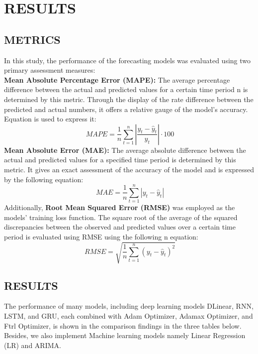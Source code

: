 \documentclass{ieeeojies}
\begin{document}
\section{RESULTS}
\subsection{METRICS}
\par In this study, the performance of the forecasting models was evaluated using two primary assessment measures:\\
\textbf{Mean Absolute Percentage Error (MAPE):} The average percentage difference between the actual and predicted values for a certain time period n is determined by this metric. Through the display of the rate difference between the predicted and actual numbers, it offers a relative gauge of the model's accuracy. Equation is used to express it:
\[\ MAPE = \frac{1}{n}\sum_{t=1}^{n} \left|\frac{y_t - \hat{y}_t}{y_t}\right| \cdot {100} \]
\textbf{Mean Absolute Error (MAE):} The average absolute difference between the actual and predicted values for a specified time period is determined by this metric. It gives an exact assessment of the accuracy of the model and is expressed by the following equation:
\[\ MAE = \frac{1}{n}\sum_{t=1}^{n} \left|{y_t - \hat{y}_t}\right|\]
Additionally, \textbf{Root Mean Squared Error (RMSE)} was employed as the models' training loss function. The square root of the average of the squared discrepancies between the observed and predicted values over a certain time period is evaluated using RMSE using the following n equation:
\[\ RMSE = \sqrt{\frac{1}{n}\sum_{t=1}^{n} (y_t - \hat{y}_t)^2}\] 

\subsection{RESULTS}
The performance of many models, including deep learning models DLinear, RNN, LSTM, and GRU, each combined with Adam Optimizer, Adamax Optimizer, and Ftrl Optimizer, is shown in the comparison findings in the three tables below. Besides, we also implement Machine learning models namely Linear Regression (LR) and ARIMA.\\
\end{document}
